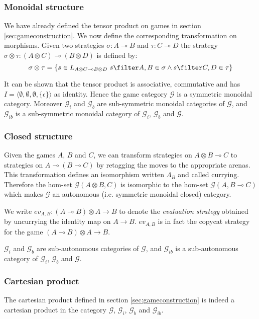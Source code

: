 \subsubsection{Monoidal structure}

We have already defined the tensor product on games in section
\ref{sec:gameconstruction}. We now define the corresponding
transformation on morphisms. Given two strategies $\sigma : A
\multimap B$ and $\tau : C \multimap D$ the strategy $\sigma \otimes
\tau : (A \otimes C) \multimap (B\otimes D)$ is defined by:
$$ \sigma \otimes \tau = \{ s \in L_{A \otimes C \multimap B\otimes D} \ s \filter A,B \in \sigma
\wedge s \filter C,D \in \tau \}$$

It can be shown that the tensor product is associative, commutative
and has $I = \langle \emptyset, \emptyset,\emptyset, \{ \epsilon \}
\rangle $ as identity. Hence the game category $\mathcal{G}$ is a
symmetric monoidal category. Moreover $\mathcal{G}_i$ and
$\mathcal{G}_b$ are sub-symmetric monoidal categories of
$\mathcal{G}$, and $\mathcal{G}_{ib}$ is a sub-symmetric monoidal
category of $\mathcal{G}_i$, $\mathcal{G}_b$ and $\mathcal{G}$.

\subsubsection{Closed structure}

Given the games $A$, $B$ and $C$, we can transform strategies on $A\otimes B \multimap C$ to
strategies on $A \multimap (B \multimap C)$ by retagging the moves to the appropriate arenas. This transformation
defines an isomorphism written $\Lambda_B$ and called currying. Therefore the hom-set $\mathcal{G}(A\otimes B, C)$ is isomorphic to the hom-set
$\mathcal{G}(A,B\multimap C)$ which makes $\mathcal{G}$ an autonomous (i.e. symmetric monoidal closed) category.

We write $ev_{A,B} : (A \multimap B) \otimes A \rightarrow B$ to denote the \emph{evaluation strategy} obtained by uncurrying the
identity map on $A \rightarrow B$. $ev_{A,B}$ is in fact the copycat strategy for the game
$(A \multimap B) \otimes A \rightarrow B$.

$\mathcal{G}_i$ and  $\mathcal{G}_b$ are sub-autonomous categories of $\mathcal{G}$,
and $\mathcal{G}_{ib}$ is a sub-autonomous category of $\mathcal{G}_i$, $\mathcal{G}_b$ and
$\mathcal{G}$.

\subsubsection{Cartesian product}
The cartesian product defined in section \ref{sec:gameconstruction} is indeed a cartesian product in the category
$\mathcal{G}$, $\mathcal{G}_i$, $\mathcal{G}_b$ and $\mathcal{G}_{ib}$.

